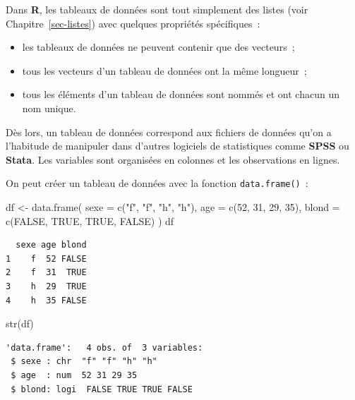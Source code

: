 \documentclass[
  letterpaper,
  DIV=11,
  numbers=noendperiod,
  oneside]{scrreprt}
\newenvironment{Shaded}{\begin{snugshade}}{\end{snugshade}}
\newcommand{\AttributeTok}[1]{\textcolor[rgb]{0.40,0.45,0.13}{#1}}
\newcommand{\ConstantTok}[1]{\textcolor[rgb]{0.56,0.35,0.01}{#1}}
\newcommand{\DecValTok}[1]{\textcolor[rgb]{0.68,0.00,0.00}{#1}}
\newcommand{\FunctionTok}[1]{\textcolor[rgb]{0.28,0.35,0.67}{#1}}
\newcommand{\NormalTok}[1]{\textcolor[rgb]{0.00,0.23,0.31}{#1}}
\newcommand{\OtherTok}[1]{\textcolor[rgb]{0.00,0.23,0.31}{#1}}
\newcommand{\StringTok}[1]{\textcolor[rgb]{0.13,0.47,0.30}{#1}}
\providecommand{\tightlist}{%
  \setlength{\itemsep}{0pt}\setlength{\parskip}{0pt}}\usepackage{longtable,booktabs,array}
\begin{document}
Dans \textbf{R}, les tableaux de données sont tout simplement des listes
(voir Chapitre~\ref{sec-listes}) avec quelques propriétés spécifiques~:

\begin{itemize}
\tightlist
\item
  les tableaux de données ne peuvent contenir que des vecteurs~;
\item
  tous les vecteurs d'un tableau de données ont la même longueur~;
\item
  tous les éléments d'un tableau de données sont nommés et ont chacun un
  nom unique.
\end{itemize}

Dès lors, un tableau de données correspond aux fichiers de données qu'on
a l'habitude de manipuler dans d'autres logiciels de statistiques comme
\textbf{SPSS} ou \textbf{Stata}. Les variables sont organisées en
colonnes et les observations en lignes.

On peut créer un tableau de données avec la fonction
\texttt{data.frame()}~:

\begin{Shaded}
\begin{Highlighting}[]
\NormalTok{df }\OtherTok{\textless{}{-}} \FunctionTok{data.frame}\NormalTok{(}
  \AttributeTok{sexe =}  \FunctionTok{c}\NormalTok{(}\StringTok{"f"}\NormalTok{, }\StringTok{"f"}\NormalTok{, }\StringTok{"h"}\NormalTok{, }\StringTok{"h"}\NormalTok{), }
  \AttributeTok{age =} \FunctionTok{c}\NormalTok{(}\DecValTok{52}\NormalTok{, }\DecValTok{31}\NormalTok{, }\DecValTok{29}\NormalTok{, }\DecValTok{35}\NormalTok{), }
  \AttributeTok{blond =} \FunctionTok{c}\NormalTok{(}\ConstantTok{FALSE}\NormalTok{, }\ConstantTok{TRUE}\NormalTok{, }\ConstantTok{TRUE}\NormalTok{, }\ConstantTok{FALSE}\NormalTok{)}
\NormalTok{)}
\NormalTok{df}
\end{Highlighting}
\end{Shaded}

\begin{verbatim}
  sexe age blond
1    f  52 FALSE
2    f  31  TRUE
3    h  29  TRUE
4    h  35 FALSE
\end{verbatim}

\begin{Shaded}
\begin{Highlighting}[]
\FunctionTok{str}\NormalTok{(df)}
\end{Highlighting}
\end{Shaded}

\begin{verbatim}
'data.frame':   4 obs. of  3 variables:
 $ sexe : chr  "f" "f" "h" "h"
 $ age  : num  52 31 29 35
 $ blond: logi  FALSE TRUE TRUE FALSE
\end{verbatim}
\end{document}
